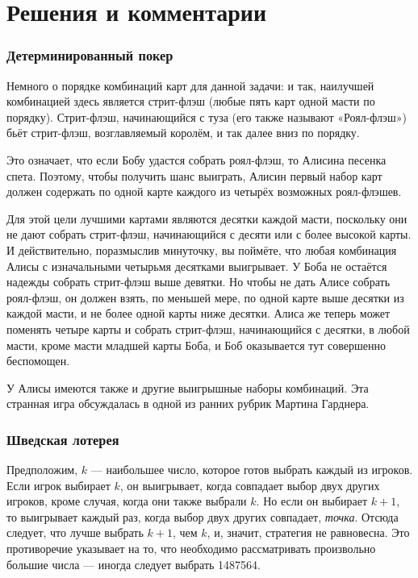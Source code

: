 \section*{Решения и комментарии}

\subsubsection*{Детерминированный покер}%

Немного о порядке комбинаций карт для данной задачи: и так, наилучшей комбинацией здесь является стрит-флэш (любые пять карт одной масти по порядку).
Стрит-флэш, начинающийся с туза (его также называют «Роял-флэш») бьёт стрит-флэш, возглавляемый королём, и так далее вниз по порядку.

Это означает, что если Бобу удастся собрать роял-флэш, то Алисина песенка спета.
Поэтому, чтобы получить шанс выиграть, Алисин первый набор карт должен содержать по одной карте каждого из четырёх возможных роял-флэшев.

Для этой цели лучшими картами являются десятки каждой масти, поскольку они не дают собрать стрит-флэш, начинающийся с десяти или с более высокой карты.
И действительно, поразмыслив минуточку, вы поймёте, что любая комбинация Алисы с изначальными четырьмя десятками выигрывает.
У Боба не остаётся надежды собрать стрит-флэш выше девятки.
Но чтобы не дать Алисе собрать роял-флэш, он должен взять, по меньшей мере, по одной карте выше десятки из каждой масти, и не более одной карты ниже десятки.
Алиса же теперь может поменять четыре карты и собрать стрит-флэш, начинающийся с десятки, в любой масти, кроме масти младшей карты Боба,
и Боб оказывается тут совершенно беспомощен.
\heart

У Алисы имеются также и другие выигрышные наборы комбинаций.
Эта странная игра обсуждалась в одной из ранних рубрик Мартина Гарднера. 

\subsubsection*{Шведская лотерея}%

Предположим, $k$ --- наибольшее число, которое готов выбрать каждый из игроков.
Если игрок выбирает $k$, он выигрывает, когда совпадает выбор двух других игроков, кроме случая, когда они также выбрали $k$.
Но если он выбирает $k+1$, то выигрывает каждый раз, когда выбор двух других совпадает, \emph{точка}.
Отсюда следует, что лучше выбрать $k+1$, чем $k$, и, значит, стратегия не равновесна.
Это противоречие указывает на то, что необходимо рассматривать произвольно большие числа --- иногда следует выбрать 1487564.
\heart

